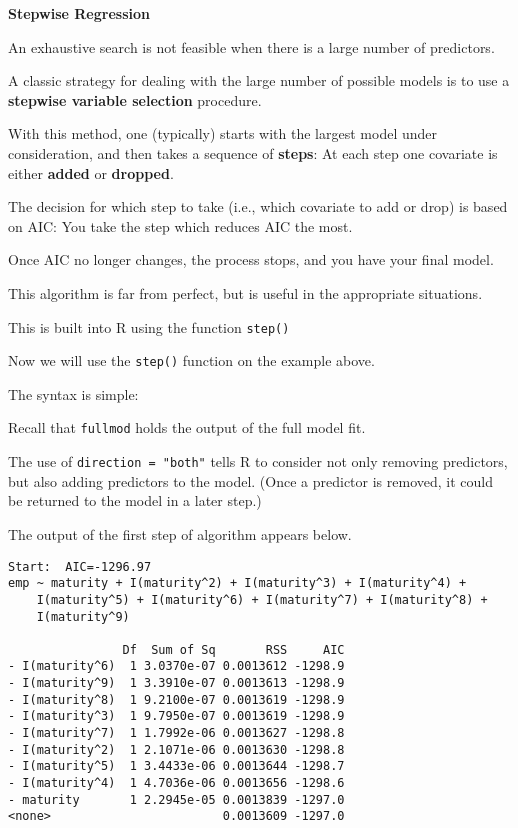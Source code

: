\documentclass{report}
\begin{document}
{\bf Stepwise Regression}

An exhaustive search is not feasible when there is a large number of
predictors.

A classic strategy for dealing with the large number of possible models
is to use a {\bf stepwise variable selection} procedure.

With this method, one (typically) starts with the largest model under consideration,
and then takes a sequence of {\bf steps}: At each step one covariate is 
either {\bf added} or {\bf dropped}.

The decision for which step to take (i.e., which covariate to add or
drop) is based on AIC: You take the step which reduces AIC the most.

Once AIC no longer changes, the process stops, and you have your final
model.

This algorithm is far from perfect, but is useful in the appropriate 
situations.

This is built into R using the function {\tt step()}


\newpage
Now we will use the {\tt step()} function on the example above.

The syntax is simple:


Recall that {\tt fullmod} holds the output of the full model fit.

The use of {\tt direction = "both"} tells R to consider not only removing
predictors, but also adding predictors to the model. (Once a predictor is removed, it
could be returned to the model in a later step.)

\newpage
The output of the first step of algorithm appears below.

\vspace{-.4in}
\normalsize
\begin{verbatim}
Start:  AIC=-1296.97
emp ~ maturity + I(maturity^2) + I(maturity^3) + I(maturity^4) + 
    I(maturity^5) + I(maturity^6) + I(maturity^7) + I(maturity^8) + 
    I(maturity^9)

                Df  Sum of Sq       RSS     AIC
- I(maturity^6)  1 3.0370e-07 0.0013612 -1298.9
- I(maturity^9)  1 3.3910e-07 0.0013613 -1298.9
- I(maturity^8)  1 9.2100e-07 0.0013619 -1298.9
- I(maturity^3)  1 9.7950e-07 0.0013619 -1298.9
- I(maturity^7)  1 1.7992e-06 0.0013627 -1298.8
- I(maturity^2)  1 2.1071e-06 0.0013630 -1298.8
- I(maturity^5)  1 3.4433e-06 0.0013644 -1298.7
- I(maturity^4)  1 4.7036e-06 0.0013656 -1298.6
- maturity       1 2.2945e-05 0.0013839 -1297.0
<none>                        0.0013609 -1297.0
\end{verbatim}
\Large
\end{document}

